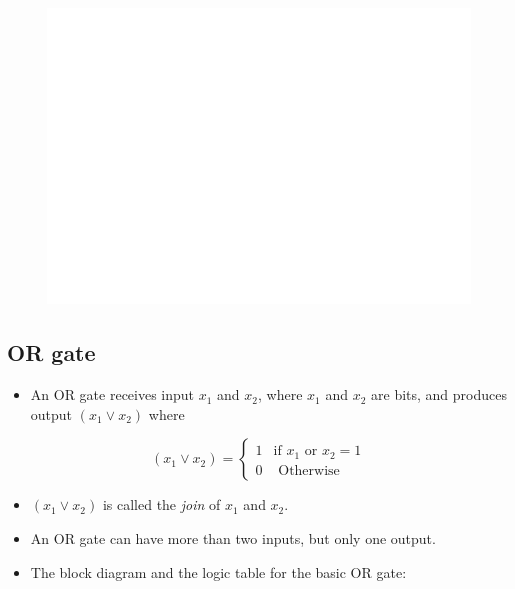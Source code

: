 \documentclass[]{book}
\providecommand{\tightlist}{%
  \setlength{\itemsep}{0pt}\setlength{\parskip}{0pt}}
\begin{document}
\begin{figure}

{\centering \includegraphics[width=1\linewidth]{figure/boxC42-1} 

}

\end{figure}

\hypertarget{or-gate}{%
\subsection{OR gate}\label{or-gate}}

\begin{itemize}
\tightlist
\item
  An OR gate receives input \(x_1\) and \(x_2\), where \(x_1\) and \(x_2\) are bits, and produces output \((x_1 \lor x_2)\) where
\end{itemize}

\begin{equation}
(x_1 \lor x_2) =
\begin{cases} 
1 & \text{if } x_1 \text{ or } x_2=1\\
0 & \text{ Otherwise }
\end{cases}
\end{equation}

\begin{itemize}
\tightlist
\item
  \((x_1 \lor x_2)\) is called the \emph{join} of \(x_1\) and \(x_2\).
\item
  An OR gate can have more than two inputs, but only one output.
\item
  The block diagram and the logic table for the basic OR gate:
\end{itemize}
\end{document}
